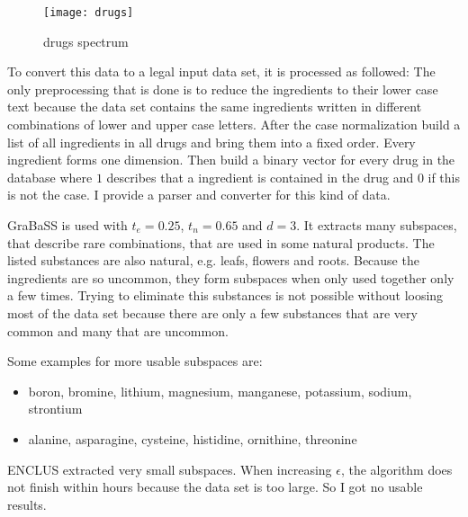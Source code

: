 \begin{figure}
	\texttt{[image: drugs]}
	\caption{drugs spectrum}
	\label{fig:drugs}
\end{figure}

To convert this data to a legal input data set, it is processed as followed: The only preprocessing that is done is to reduce the ingredients to their lower case text because the data set contains the same ingredients written in different combinations of lower and upper case letters. After the case normalization build a list of all ingredients in all drugs and bring them into a fixed order. Every ingredient forms one dimension. Then build a binary vector for every drug in the database where $1$ describes that a ingredient is contained in the drug and $0$ if this is not the case. I provide a parser and converter for this kind of data.

GraBaSS is used with $t_e = 0.25$, $t_n = 0.65$ and $d = 3$. It extracts many subspaces, that describe rare combinations, that are used in some natural products. The listed substances are also natural, e.g. leafs, flowers and roots. Because the ingredients are so uncommon, they form subspaces when only used together only a few times. Trying to eliminate this substances is not possible without loosing most of the data set because there are only a few substances that are very common and many that are uncommon.

Some examples for more usable subspaces are:
\begin{itemize}
	\item boron, bromine, lithium, magnesium, manganese, potassium, sodium, strontium
	\item alanine, asparagine, cysteine, histidine, ornithine, threonine
\end{itemize}

ENCLUS extracted very small subspaces. When increasing $\epsilon$, the algorithm does not finish within hours because the data set is too large. So I got no usable results.

